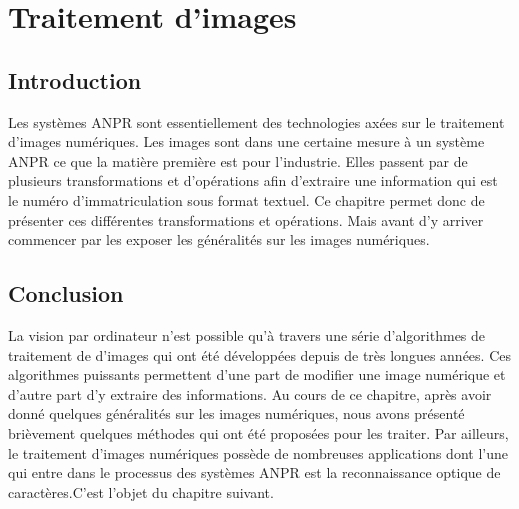 \chapter{\textbf{Traitement d'images}}
    \section{Introduction}
    Les systèmes ANPR sont essentiellement des technologies axées sur le traitement d’images numériques. Les images sont dans une certaine mesure à un système ANPR ce que la matière première est pour l’industrie. Elles passent par de plusieurs transformations et d’opérations afin d'extraire une information qui est le numéro d’immatriculation sous format textuel. Ce chapitre permet donc de présenter ces différentes transformations et opérations. Mais avant d’y arriver commencer par les exposer les généralités sur les images numériques.

    
    


    \section{Conclusion}
    La vision par ordinateur n’est possible qu’à travers une série d’algorithmes de traitement de d’images qui ont été développées depuis de très longues années. Ces algorithmes puissants permettent d’une part de modifier une image numérique  et d’autre part d'y  extraire des informations. Au cours de ce chapitre, après avoir donné quelques généralités sur les images numériques, nous avons présenté brièvement quelques méthodes qui ont été proposées pour les traiter. Par ailleurs, le traitement d’images numériques possède de nombreuses applications dont l’une qui entre dans le processus des systèmes ANPR est la reconnaissance optique de caractères.C’est l’objet du chapitre suivant. 
